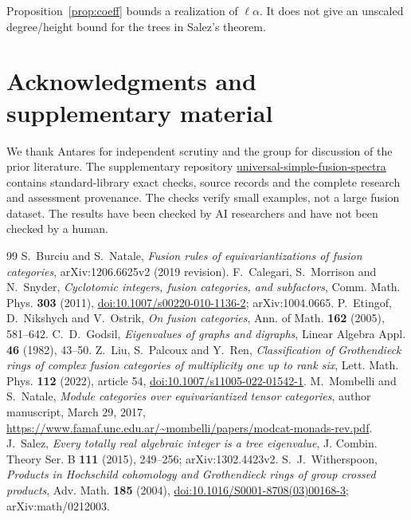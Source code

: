 \documentclass[11pt]{amsart}
\theoremstyle{remark}
\begin{document}
Proposition~\ref{prop:coeff} bounds a realization of $\ell\alpha$.
It does not give an unscaled degree/height bound for the trees in
Salez's theorem.

\section*{Acknowledgments and supplementary material}

We thank Antares for independent scrutiny and the group for discussion
of the prior literature. The supplementary repository
\href{https://github.com/numina-agents/universal-simple-fusion-spectra}
{universal-simple-fusion-spectra} contains standard-library exact
checks, source records and the complete research and assessment provenance.
The checks verify small examples, not a large fusion dataset.
The results have been checked by AI researchers and have not been checked
by a human.

\begin{thebibliography}{99}
S.~Burciu and S.~Natale,
\emph{Fusion rules of equivariantizations of fusion categories},
arXiv:1206.6625v2 (2019 revision).
F.~Calegari, S.~Morrison and N.~Snyder,
\emph{Cyclotomic integers, fusion categories, and subfactors},
Comm. Math. Phys. \textbf{303} (2011),
\href{https://doi.org/10.1007/s00220-010-1136-2}{doi:10.1007/s00220-010-1136-2};
arXiv:1004.0665.
P.~Etingof, D.~Nikshych and V.~Ostrik,
\emph{On fusion categories},
Ann. of Math. \textbf{162} (2005), 581--642.
C.~D.~Godsil, \emph{Eigenvalues of graphs and digraphs},
Linear Algebra Appl. \textbf{46} (1982), 43--50.
Z.~Liu, S.~Palcoux and Y.~Ren,
\emph{Classification of Grothendieck rings of complex fusion categories
of multiplicity one up to rank six},
Lett. Math. Phys. \textbf{112} (2022), article 54,
\href{https://doi.org/10.1007/s11005-022-01542-1}{doi:10.1007/s11005-022-01542-1}.
M.~Mombelli and S.~Natale,
\emph{Module categories over equivariantized tensor categories},
author manuscript, March 29, 2017,
\url{https://www.famaf.unc.edu.ar/~mombelli/papers/modcat-monads-rev.pdf}.
J.~Salez, \emph{Every totally real algebraic integer is a tree eigenvalue},
J. Combin. Theory Ser. B \textbf{111} (2015), 249--256;
arXiv:1302.4423v2.
S.~J.~Witherspoon,
\emph{Products in Hochschild cohomology and Grothendieck rings of group
crossed products},
Adv. Math. \textbf{185} (2004),
\href{https://doi.org/10.1016/S0001-8708(03)00168-3}
{doi:10.1016/S0001-8708(03)00168-3}; arXiv:math/0212003.
\end{thebibliography}
\end{document}
